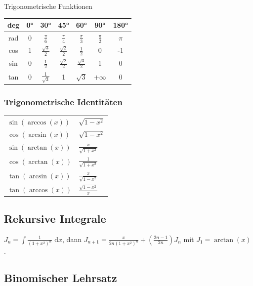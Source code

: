 \documentclass[a4paper,10pt]{article}
\def\dx{\text{ d}x}
\begin{document}
\begin{mainbox}{Trigonometrische Funktionen}
  \begin{center} 
    \begin{tabular}{c|cccccc}
      deg & 0° & 30° & 45° & 60° & 90° & 180° \\
      \midrule
      rad & 0 & $\frac{\pi}{6}$ & $\frac{\pi}{4}$ & $\frac{\pi}{3}$ & $\frac{\pi}{2}$ & $\pi$ \\
      cos & 1 & $\frac{\sqrt{3}}{2}$ & $\frac{\sqrt{2}}{2}$ & $\frac{1}{2}$ & 0 & -1 \\
      sin & 0 & $\frac{1}{2}$ & $\frac{\sqrt{2}}{2}$ & $\frac{\sqrt{3}}{2}$ & 1 & 0 \\
      tan & 0 & $\frac{1}{\sqrt{3}}$ & 1 & $\sqrt{3}$ & $+\infty$ & 0 \\
    \end{tabular}
  \end{center}
\end{mainbox}

\subsubsection{Trigonometrische Identitäten}
\begin{center}
 \begin{tabularx}{\linewidth}{>{\centering\arraybackslash}X>{\centering\arraybackslash}X}
  \toprule
  $\sin(\arccos (x))$ & $\sqrt{1-x^2}$\\
  $\cos(\arcsin(x))$ & $\sqrt{1-x^2}$\\
  $\sin(\arctan(x))$ & $\frac{x}{\sqrt{1+x^2}}$\\
  $\cos(\arctan(x))$ & $\frac{1}{\sqrt{1+x^2}}$\\
  $\tan(\arcsin(x))$ & $\frac{x}{\sqrt{1-x^2}}$\\
  $\tan(\arccos(x))$ & $\frac{\sqrt{1-x^2}}{x}$\\
  \bottomrule
 \end{tabularx}
\end{center}

\subsection{Rekursive Integrale}

$J_n = \int \frac{1}{(1 + x^2)^n} \dx$, dann $J_{n+1} = \frac{x}{2n(1 + x^2)^n} + (\frac{2n - 1}{2n})J_n$ mit $J_1 = \arctan(x)$.

\subsection{Binomischer Lehrsatz}
\end{document}
